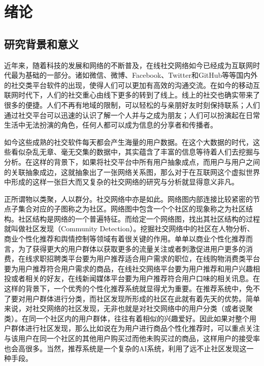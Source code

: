 \chapter{绪论}
\section{研究背景和意义}
近年来，随着科技的发展和网络的不断普及，在线社交网络如今已经成为互联网时代最为基础的一部分。诸如微信、微博、Facebook、Twitter和GitHub等等国内外的社交类平台软件的出现，使得人们可以更加有高效的沟通交流。在如今的移动互联网时代下，人们的社交重心由线下更多的转到了线上。线上的社交也确实带来了很多的便捷。人们不再有地域的限制，可以轻松的与亲朋好友时刻保持联系；人们通过社交平台可以迅速的认识了解一个人并与之成为朋友；人们可以扮演起在日常生活中无法扮演的角色，任何人都可以成为信息的分享者和传播者。

如今这些成熟的社交软件每天都会产生海量的用户数据。在这个大数据的时代，这些看似杂乱无章、毫无交集的数据中，其实蕴含了丰富的信息等待着人们去挖掘与分析。在这样的背景下，如果将社交平台中所有用户抽象成点，而用户与用户之间的关联抽象成边，这就抽象出了一张网络关系图，那么对于在互联网这个虚拟世界中形成的这样一张巨大而又复杂的社交网络的研究与分析就显得意义非凡。

正所谓物以类聚，人以群分。社交网络中亦是如此。网络图内部连接比较紧密的节点子集合对应的子图称之为社区。网络图中包含一个个社区的现象称之为社区结构。社区结构是网络的一个普遍特征。而给定一个网络图，找出其社区结构的过程就叫做社区发现（Community Detection）。挖掘社交网络中的社区在人物分析、商业个性化推荐和舆情控制等领域有着很关键的作用。单单以商业个性化推荐而言，为了获得更大的用户群体以获取更多的流量关注或者刺激促进用户更多的消费，在线求职招聘类平台要为用户推荐适合用户需求的职位，在线购物消费类平台要为用户推荐符合用户需求的商品，在线社交网络平台要为用户推荐和用户兴趣相投或者相关的好友，在线新闻媒体平台要为用户推荐符合用户口味的相关讯息。在这样的背景下，一个优秀的个性化推荐系统就显得尤为重要。在推荐系统中，免不了要对用户群体进行分类，而社区发现所形成的社区在此就有着先天的优势。简单来说，对社交网络的社区发现，无非也就是对社交网络中的用户分类（或者说聚类）。在同一个社区内的用户群体，往往有着相似的兴趣爱好。因此如果对整个用户群体进行社区发现，那么比如说在为用户进行商品个性化推荐时，可以重点关注与该用户在同一个社区的其他用户购买过而他未购买过的商品，这样用户的接受率也会高很多。当然，推荐系统是一个复杂的AI系统，利用了远不止社区发现这一种手段。

